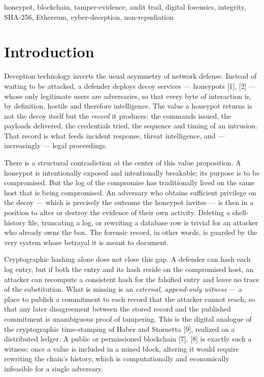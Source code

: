 \documentclass[conference]{IEEEtran}
\begin{document}
\begin{IEEEkeywords}
honeypot, blockchain, tamper-evidence, audit trail, digital forensics, integrity, SHA-256, Ethereum, cyber-deception, non-repudiation
\end{IEEEkeywords}

\section{Introduction}

Deception technology inverts the usual asymmetry of network defense. Instead of waiting to be attacked, a defender deploys decoy services --- honeypots [1], [2] --- whose only legitimate users are adversaries, so that every byte of interaction is, by definition, hostile and therefore intelligence. The value a honeypot returns is not the decoy itself but the \emph{record} it produces: the commands issued, the payloads delivered, the credentials tried, the sequence and timing of an intrusion. That record is what feeds incident response, threat intelligence, and --- increasingly --- legal proceedings.

There is a structural contradiction at the center of this value proposition. A honeypot is intentionally exposed and intentionally breakable; its purpose is to be compromised. But the log of the compromise has traditionally lived on the same host that is being compromised. An adversary who obtains sufficient privilege on the decoy --- which is precisely the outcome the honeypot invites --- is then in a position to alter or destroy the evidence of their own activity. Deleting a shell-history file, truncating a log, or rewriting a database row is trivial for an attacker who already owns the box. The forensic record, in other words, is guarded by the very system whose betrayal it is meant to document.

Cryptographic hashing alone does not close this gap. A defender can hash each log entry, but if both the entry and its hash reside on the compromised host, an attacker can recompute a consistent hash for the falsified entry and leave no trace of the substitution. What is missing is an \emph{external, append-only witness} --- a place to publish a commitment to each record that the attacker cannot reach, so that any later disagreement between the stored record and the published commitment is unambiguous proof of tampering. This is the digital analogue of the cryptographic time-stamping of Haber and Stornetta [9], realized on a distributed ledger. A public or permissioned blockchain [7], [8] is exactly such a witness: once a value is included in a mined block, altering it would require rewriting the chain's history, which is computationally and economically infeasible for a single adversary.
\end{document}

